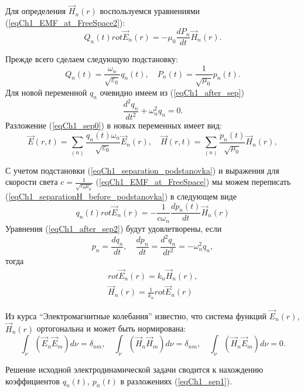 Для определения $\vec{H}_n\left(r\right)$ воспользуемся уравнениями 
(\ref{eqCh1_EMF_at_FreeSpace2}):
\begin{equation}
Q_n\left(t\right)  rot
\vec{E}_n\left(r\right) = -\mu_0 \frac{d P_n}{d t}
\vec{H}_n\left(r\right).
\label{eqCh1_separationH_before_podstanovka}
\end{equation}

Прежде всего сделаем следующую подстановку:
\begin{equation}
Q_n\left(t\right) = \frac{\omega_n}{\sqrt{\varepsilon_0}}q_n\left(t\right),
\quad
P_n\left(t\right) = \frac{1}{\sqrt{\mu_0}}p_n\left(t\right).
\label{eqCh1_separation_podstanovka}
\end{equation}
Для новой переменной $q_n$ очевидно имеем из (\ref{eqCh1_after_sep})
\[
\frac{d^2 q_n}{d t^2} + \omega_n^2 q_n = 0.
\]
Разложение (\ref{eqCh1_sep0}) в новых переменных имеет вид:
\begin{equation}
\vec{E}\left(r, t\right) = \sum_{(n)}
\frac{q_n\left(t\right) \omega_n}{\sqrt{\varepsilon_0}} \vec{E}_n\left(r\right),
\quad
\vec{H}\left(r, t\right) = \sum_{(n)}
\frac{p_n\left(t\right)}{\sqrt{\mu_0}} \vec{H}_n\left(r\right),
\label{eqCh1_sep1}
\end{equation}

С учетом подстановки (\ref{eqCh1_separation_podstanovka}) и выражения
для скорости света $c =   \frac{1}{\sqrt{\varepsilon_0 \mu_0}}$
(\ref{eqCh1_EMF_at_FreeSpace}) мы можем переписать 
(\ref{eqCh1_separationH_before_podstanovka}) в следующем виде 
\begin{equation}
q_n\left(t\right) rot \vec{E}_n\left(r\right) = - \frac{1}{c \omega_n}
\frac{d p_n\left(t\right)}{d t} \vec{H}_n\left(r\right)
\label{eqCh1_after_sep2}
\end{equation}
Уравнения (\ref{eqCh1_after_sep2}) будут удовлетворены, если  
\[
p_n = \frac{d q_n}{d t}, \quad \frac{d p_n}{d t} = 
\frac{d^2 q_n}{d t^2} = - \omega_n^2 q_n,
\]
тогда
\begin{eqnarray}
rot \vec{E}_n\left(r\right) = k_n \vec{H}_n\left(r\right),
\nonumber \\
\vec{H}_n\left(r\right) =  \frac{1}{k_n} rot \vec{E}_n\left(r\right)
\end{eqnarray}

Из курса ``Электромагнитные колебания'' известно, что система функций  
$\vec{E}_n\left(r\right)$, $\vec{H}_n\left(r\right)$ ортогональна и
может быть нормирована: 
\begin{equation}
\int_{\nu} \left( \vec{E}_n \vec{E}_m \right) d \nu = \delta_{nm},
\quad
\int_{\nu} \left( \vec{H}_n \vec{H}_m \right) d \nu = \delta_{nm},
\quad
\int_{\nu} \left( \vec{H}_n \vec{E}_m \right) d \nu = 0.
\label{eqCh1_task1}
\end{equation}

Решение исходной электродинамической задачи сводится к нахождению
коэффициентов  $q_n\left(t\right)$, $p_n\left(t\right)$    
в разложениях (\ref{eqCh1_sep1}).
